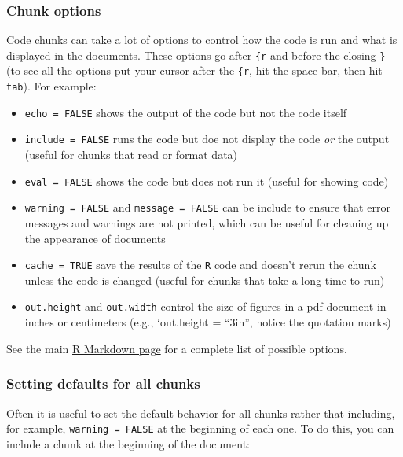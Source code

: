 \documentclass[]{article}
\begin{document}
\hypertarget{chunk-options}{%
\subsubsection{Chunk options}\label{chunk-options}}

Code chunks can take a lot of options to control how the code is run and
what is displayed in the documents. These options go after \texttt{\{r}
and before the closing \texttt{\}} (to see all the options put your
cursor after the \texttt{\{r}, hit the space bar, then hit
\texttt{tab}). For example:

\begin{itemize}
\item
  \texttt{echo\ =\ FALSE} shows the output of the code but not the code
  itself
\item
  \texttt{include\ =\ FALSE} runs the code but doe not display the code
  \emph{or} the output (useful for chunks that read or format data)
\item
  \texttt{eval\ =\ FALSE} shows the code but does not run it (useful for
  showing code)
\item
  \texttt{warning\ =\ FALSE} and \texttt{message\ =\ FALSE} can be
  include to ensure that error messages and warnings are not printed,
  which can be useful for cleaning up the appearance of documents
\item
  \texttt{cache\ =\ TRUE} save the results of the \texttt{R} code and
  doesn't rerun the chunk unless the code is changed (useful for chunks
  that take a long time to run)
\item
  \texttt{out.height} and \texttt{out.width} control the size of figures
  in a pdf document in inches or centimeters (e.g., `out.height =
  ``3in'', notice the quotation marks)
\end{itemize}

See the main \href{http://yihui.name/knitr/options/}{R Markdown page}
for a complete list of possible options.

\hypertarget{setting-defaults-for-all-chunks}{%
\subsubsection{Setting defaults for all
chunks}\label{setting-defaults-for-all-chunks}}

Often it is useful to set the default behavior for all chunks rather
that including, for example, \texttt{warning\ =\ FALSE} at the beginning
of each one. To do this, you can include a chunk at the beginning of the
document:
\end{document}
